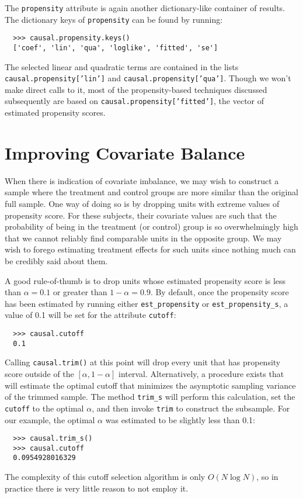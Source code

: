 \documentclass[12pt]{article}
\theoremstyle{definition}
\theoremstyle{definition}
\theoremstyle{definition}
\theoremstyle{remark}
\begin{document}
The \texttt{propensity} attribute is again another dictionary-like container of results. The dictionary keys of \texttt{propensity} can be found by running:
\begin{verbatim}
  >>> causal.propensity.keys()
  ['coef', 'lin', 'qua', 'loglike', 'fitted', 'se']
\end{verbatim}
The selected linear and quadratic terms are contained in the lists \texttt{causal.propensity['lin']} and \texttt{causal.propensity['qua']}. Though we won't make direct calls to it, most of the propensity-based techniques discussed subsequently are based on \texttt{causal.propensity['fitted']}, the vector of estimated propensity scores.


\section{Improving Covariate Balance} \label{sec.d}

When there is indication of covariate imbalance, we may wish to construct a sample where the treatment and control groups are more similar than the original full sample. One way of doing so is by dropping units with extreme values of propensity score. For these subjects, their covariate values are such that the probability of being in the treatment (or control) group is so overwhelmingly high that we cannot reliably find comparable units in the opposite group. We may wish to forego estimating treatment effects for such units since nothing much can be credibly said about them.

A good rule-of-thumb is to drop units whose estimated propensity score is less than $\alpha=0.1$ or greater than $1-\alpha=0.9$. By default, once the propensity score has been estimated by running either \texttt{est\_propensity} or \texttt{est\_propensity\_s}, a value of 0.1 will be set for the attribute \texttt{cutoff}:

\begin{verbatim}
  >>> causal.cutoff
  0.1
\end{verbatim}

Calling \texttt{causal.trim()} at this point will drop every unit that has propensity score outside of the $[\alpha, 1-\alpha]$ interval. Alternatively, a procedure exists that will estimate the optimal cutoff that minimizes the asymptotic sampling variance of the trimmed sample. The method \texttt{trim\_s} will perform this calculation, set the \texttt{cutoff} to the optimal $\alpha$, and then invoke \texttt{trim} to construct the subsample. For our example, the optimal $\alpha$ was estimated to be slightly less than 0.1:
\begin{verbatim}
  >>> causal.trim_s()
  >>> causal.cutoff
  0.0954928016329
\end{verbatim}
The complexity of this cutoff selection algorithm is only $O(N \log N)$, so in practice there is very little reason to not employ it.
\end{document}
